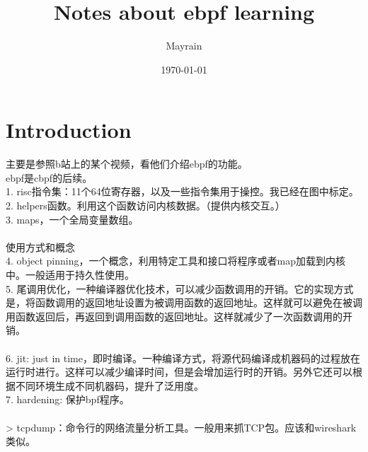\documentclass{article}
\title{Notes about ebpf learning}
\author{Mayrain}
\date{\today}
\begin{document}
\maketitle

\section{Introduction}
主要是参照b站上的某个视频，看他们介绍ebpf的功能。\\
ebpf是cbpf的后续。\\
1. risc指令集：11个64位寄存器，以及一些指令集用于操控。我已经在图中标定。\\
2. helpers函数。利用这个函数访问内核数据。（提供内核交互。）\\
3. maps，一个全局变量数组。\\
\\
使用方式和概念\\
4. object pinning，一个概念，利用特定工具和接口将程序或者map加载到内核中。一般适用于持久性使用。\\
5. 尾调用优化，一种编译器优化技术，可以减少函数调用的开销。它的实现方式是，将函数调用的返回地址设置为被调用函数的返回地址。这样就可以避免在被调用函数返回后，再返回到调用函数的返回地址。这样就减少了一次函数调用的开销。\\
\\
6. jit: just in time，即时编译。一种编译方式，将源代码编译成机器码的过程放在运行时进行。这样可以减少编译时间，但是会增加运行时的开销。另外它还可以根据不同环境生成不同机器码，提升了泛用度。\\
7. hardening: 保护bpf程序。\\
\\
> tcpdump：命令行的网络流量分析工具。一般用来抓TCP包。应该和wireshark类似。\\
\end{document}
